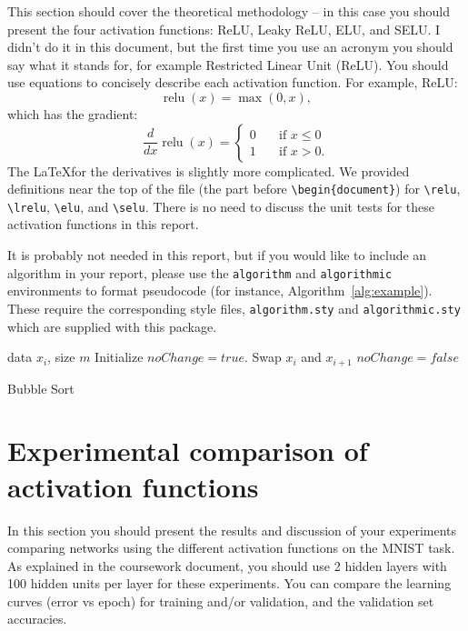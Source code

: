 \documentclass{article}
\DeclareMathOperator{\relu}{relu}
\DeclareMathOperator{\lrelu}{lrelu}
\DeclareMathOperator{\elu}{elu}
\DeclareMathOperator{\selu}{selu}
\begin{document}
This section should cover the theoretical methodology -- in this case you should present the four activation functions: ReLU, Leaky ReLU, ELU, and SELU.  I didn't do it in this document, but the first time you use an acronym you should say what it stands for, for example Restricted Linear Unit (ReLU).  You should use equations to concisely describe each activation function.  For example, ReLU: 
\begin{equation}
  \relu(x) = \max(0, x) ,
\end{equation} 
which has the gradient:
\begin{equation}
  \frac{d}{dx} \relu(x) =
     \begin{cases} 
      0      & \quad \text{if } x \leq  0 \\
      1       & \quad \text{if } x > 0 .
    \end{cases} 
\end{equation}
The \LaTeX for the derivatives is slightly more complicated.  We provided definitions near the top of the file (the part before \verb+\begin{document}+) for \verb+\relu+, \verb+\lrelu+, \verb+\elu+, and \verb+\selu+.  There is no need to discuss the unit tests for these activation functions in this report.

It is probably not needed in this report, but if you would like to include an algorithm in your report, please use the \verb+algorithm+ and \verb+algorithmic+ environments to format pseudocode (for instance, Algorithm~\ref{alg:example}). These require the corresponding style files, \verb+algorithm.sty+ and \verb+algorithmic.sty+ which are supplied with this package. 

\begin{algorithm}[ht]
\begin{algorithmic}
    data $x_i$, size $m$
   \REPEAT
   \STATE Initialize $noChange = true$.
   \STATE Swap $x_i$ and $x_{i+1}$
   \STATE $noChange = false$
   \ENDIF
   \ENDFOR
\end{algorithmic}
  \caption{Bubble Sort}
  \label{alg:example}
\end{algorithm}

\section{Experimental comparison of activation functions}
\label{sec:actexpts}
In this section you should present the results and discussion of your experiments comparing networks using the different activation functions on the MNIST task.  As explained in the coursework document, you should use 2 hidden layers with 100 hidden units per layer for these experiments.  You can compare the learning curves (error vs epoch) for training and/or validation, and the validation set accuracies. 
\end{document}
